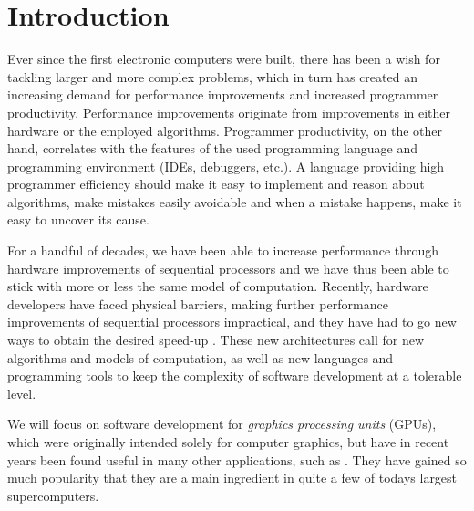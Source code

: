 
\chapter{Introduction}
Ever since the first electronic computers were built, there has been a
wish for tackling larger and more complex problems, which in turn has
created an increasing demand for performance improvements and
increased programmer productivity. Performance improvements originate
from improvements in either hardware or the employed
algorithms. Programmer productivity, on the other hand, correlates
with the features of the used programming language and programming
environment (IDEs, debuggers, etc.). A language providing high
programmer efficiency should make it easy to implement and reason
about algorithms, make mistakes easily avoidable and when a mistake
happens, make it easy to uncover its cause. 

For a handful of decades, we have been able to increase performance
through hardware improvements of sequential processors and we have
thus been able to stick with more or less the same model of
computation. Recently, hardware developers have faced physical
barriers, making further performance improvements of sequential
processors impractical, and they have had to go new ways to obtain the
desired speed-up \cite{sutter2006freelunchisover}. These new architectures call
for new algorithms and models of computation, as well as new languages
and programming tools to keep the complexity of software development
at a tolerable level.

We will focus on software development for \textit{graphics processing
  units} (GPUs), which were originally intended solely for computer
graphics, but have in recent years been found useful in many other
applications, such as . They have gained so
much popularity that they are a main ingredient in quite a few of
todays largest supercomputers.

